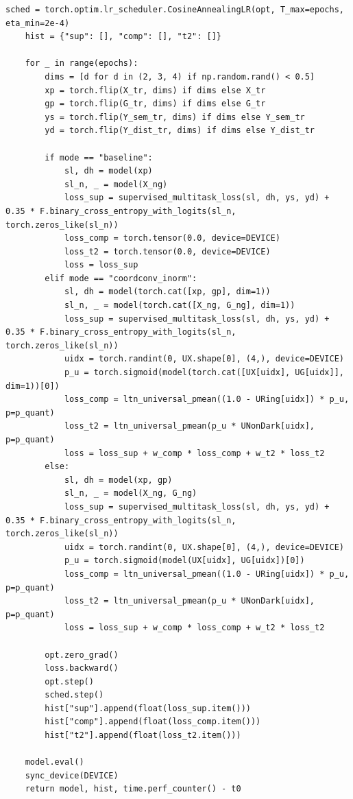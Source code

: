 \documentclass[10pt,a4paper]{article}
\begin{document}
\begin{codebox}[{In [4] $\cdot$ Python --- Step 4 -- Controlled 5-model ablation study (SSL warm-start, Organ-GPS, p=1 vs p=3, calibration)}]
\begin{lstlisting}[style=pybmed]
    sched = torch.optim.lr_scheduler.CosineAnnealingLR(opt, T_max=epochs, eta_min=2e-4)
    hist = {"sup": [], "comp": [], "t2": []}

    for _ in range(epochs):
        dims = [d for d in (2, 3, 4) if np.random.rand() < 0.5]
        xp = torch.flip(X_tr, dims) if dims else X_tr
        gp = torch.flip(G_tr, dims) if dims else G_tr
        ys = torch.flip(Y_sem_tr, dims) if dims else Y_sem_tr
        yd = torch.flip(Y_dist_tr, dims) if dims else Y_dist_tr

        if mode == "baseline":
            sl, dh = model(xp)
            sl_n, _ = model(X_ng)
            loss_sup = supervised_multitask_loss(sl, dh, ys, yd) + 0.35 * F.binary_cross_entropy_with_logits(sl_n, torch.zeros_like(sl_n))
            loss_comp = torch.tensor(0.0, device=DEVICE)
            loss_t2 = torch.tensor(0.0, device=DEVICE)
            loss = loss_sup
        elif mode == "coordconv_inorm":
            sl, dh = model(torch.cat([xp, gp], dim=1))
            sl_n, _ = model(torch.cat([X_ng, G_ng], dim=1))
            loss_sup = supervised_multitask_loss(sl, dh, ys, yd) + 0.35 * F.binary_cross_entropy_with_logits(sl_n, torch.zeros_like(sl_n))
            uidx = torch.randint(0, UX.shape[0], (4,), device=DEVICE)
            p_u = torch.sigmoid(model(torch.cat([UX[uidx], UG[uidx]], dim=1))[0])
            loss_comp = ltn_universal_pmean((1.0 - URing[uidx]) * p_u, p=p_quant)
            loss_t2 = ltn_universal_pmean(p_u * UNonDark[uidx], p=p_quant)
            loss = loss_sup + w_comp * loss_comp + w_t2 * loss_t2
        else:
            sl, dh = model(xp, gp)
            sl_n, _ = model(X_ng, G_ng)
            loss_sup = supervised_multitask_loss(sl, dh, ys, yd) + 0.35 * F.binary_cross_entropy_with_logits(sl_n, torch.zeros_like(sl_n))
            uidx = torch.randint(0, UX.shape[0], (4,), device=DEVICE)
            p_u = torch.sigmoid(model(UX[uidx], UG[uidx])[0])
            loss_comp = ltn_universal_pmean((1.0 - URing[uidx]) * p_u, p=p_quant)
            loss_t2 = ltn_universal_pmean(p_u * UNonDark[uidx], p=p_quant)
            loss = loss_sup + w_comp * loss_comp + w_t2 * loss_t2

        opt.zero_grad()
        loss.backward()
        opt.step()
        sched.step()
        hist["sup"].append(float(loss_sup.item()))
        hist["comp"].append(float(loss_comp.item()))
        hist["t2"].append(float(loss_t2.item()))

    model.eval()
    sync_device(DEVICE)
    return model, hist, time.perf_counter() - t0


\end{lstlisting}
\end{codebox}
\end{document}
